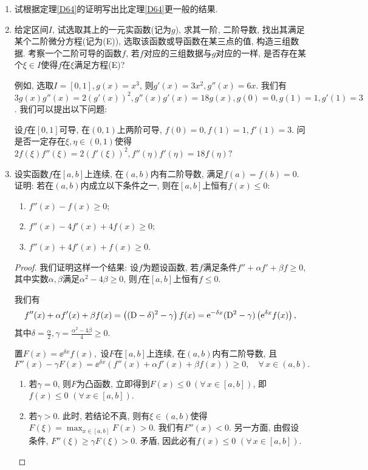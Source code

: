 \begin{4b}
\begin{enumerate}
\item 试根据定理\ref{D64}的证明写出比定理\ref{D64}更一般的结果.
\item 给定区间\(I\), 试选取其上的一元实函数(记为\(g\)), 求其一阶, 二阶导数, 
找出其满足某个二阶微分方程(记为(E)), 选取该函数或导函数在某三点的值, 构造三组数据. 
考察一个二阶可导的函数\(f\), 若\(f\)对应的三组数据与\(g\)对应的一样, 
是否存在某个\(\xi\in I\)使得\(f\)在\(\xi\)满足方程(E)?

例如, 选取\(I=[0,1],g(x)=x^3\), 则\(g'(x)=3x^2,g''(x)=6x\). 
我们有\(3g(x)g''(x)=2(g'(x))^2,g''(x)g'(x)=18g(x),g(0)=0,g(1)=1,g'(1)=3\). 我们可以提出以下问题: 

设\(f\)在\([0,1]\)可导, 在\((0,1)\)上两阶可导, \(f(0)=0,f(1)=1,f'(1)=3\). 
问是否一定存在\(\xi,\eta\in(0,1)\)使得\(2f(\xi)f''(\xi)=2(f'(\xi))^2,f''(\eta)f'(\eta)=18f(\eta)?\)
\item 设实函数\(f\)在\([a,b]\)上连续, 在\((a,b)\)内有二阶导数, 满足\(f(a)=f(b)=0\). 
证明: 若在\((a,b)\)内成立以下条件之一, 则在\([a,b]\)上恒有\(f(x)\leqslant 0\):
\begin{enumerate}[label=(\arabic*)]
\item \(f''(x)-f(x)\geqslant 0\);
\item \(f''(x)-4f'(x)+4f(x)\geqslant 0\);
\item \(f''(x)+4f'(x)+f(x)\geqslant 0\).
\end{enumerate}
\begin{proof}
我们证明这样一个结果: 设\(f\)为题设函数, 
若\(f\)满足条件\(f''+\alpha f'+\beta f\geqslant 0\), 
其中实数\(\alpha,\beta\)满足\(\alpha^2-4\beta\geqslant 0\), 
则\(f\)在\([a,b]\)上恒有\(f\leqslant 0\).

我们有\[f''(x)+\alpha f'(x)+\beta f(x)=\left(({\rm D}-\delta)^2-\gamma\right)f(x)
=\mathrm{e}^{-\delta x}({\rm D}^2-\gamma)\left(\mathrm{e}^{\delta x}f(x)\right),\]
其中\(\delta=\frac{\alpha}{2},\gamma=\frac{\alpha^2-4\beta}{4}\geqslant 0\).

置\(F(x)=\ee^{\delta x}f(x),\) 设\(F\)在\([a,b]\)上连续, 在\((a,b)\)内有二阶导数, 且
\[F''(x)-\gamma F(x)=\ee^{\delta x}\left(f''(x)+\alpha f'(x)+\beta f(x)\right)\geqslant 0,\quad \forall\, x\in(a,b).\]
\begin{enumerate}[label=(\roman*)]
\item 若\(\gamma=0\), 则\(F\)为凸函数, 立即得到\(F(x)\leqslant 0\ (\forall\, x\in[a,b])\), 即\(f(x)\leqslant 0\) \((\forall\, x\in[a,b])\).
\item 若\(\gamma>0\). 此时, 若结论不真, 则有\(\xi\in(a,b)\)使得\(F(\xi)=\max_{x\in[a,b]}F(x)>0\). 我们有\(F''(x)<0\). 
另一方面, 由假设条件, \(F''(\xi)\geqslant\gamma F(\xi)>0\). 矛盾, 因此必有\(f(x)\leqslant 0\) \((\forall\, x\in[a,b])\).
\end{enumerate}


\end{proof}
\end{enumerate}
\end{4b}
